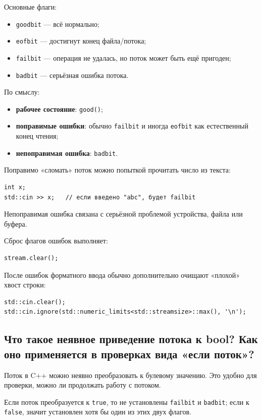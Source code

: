Основные флаги:
\begin{itemize}
    \item \texttt{goodbit} — всё нормально;
    \item \texttt{eofbit} — достигнут конец файла/потока;
    \item \texttt{failbit} — операция не удалась, но поток может быть ещё пригоден;
    \item \texttt{badbit} — серьёзная ошибка потока.
\end{itemize}

По смыслу:
\begin{itemize}
    \item \textbf{рабочее состояние}: \texttt{good()};
    \item \textbf{поправимые ошибки}: обычно \texttt{failbit} и иногда \texttt{eofbit} как естественный конец чтения;
    \item \textbf{непоправимая ошибка}: \texttt{badbit}.
\end{itemize}

\begin{example}
Поправимо «сломать» поток можно попыткой прочитать число из текста:
\begin{verbatim}
int x;
std::cin >> x;   // если введено "abc", будет failbit
\end{verbatim}

Непоправимая ошибка связана с серьёзной проблемой устройства, файла или буфера.
\end{example}

Сброс флагов ошибок выполняет:
\begin{verbatim}
stream.clear();
\end{verbatim}

После ошибок форматного ввода обычно дополнительно очищают «плохой» хвост строки:
\begin{verbatim}
std::cin.clear();
std::cin.ignore(std::numeric_limits<std::streamsize>::max(), '\n');
\end{verbatim}

\subsection{Что такое неявное приведение потока к bool? Как оно применяется в проверках вида «если поток»?}
Поток в C++ можно неявно преобразовать к булевому значению. Это удобно для проверки, можно ли продолжать работу с потоком.

\begin{definition}
Если поток преобразуется к \texttt{true}, то не установлены \texttt{failbit} и \texttt{badbit}; если к \texttt{false}, значит установлен хотя бы один из этих двух флагов.
\end{definition}

